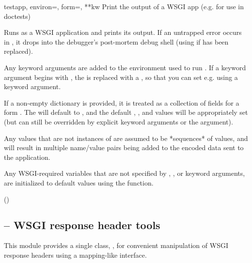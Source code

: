 \begin{funcdesc}{test}{app, environ=\code{\{\}}, form=\code{\{\}}, **kw} 
Print the output of a WSGI app (e.g. for use in doctests)

Runs  as a WSGI application and prints its output.  If an untrapped
error occurs in , it drops into the  debugger's post-mortem
debug shell (using  if  has been
replaced).

Any keyword arguments are added to the environment used to run .  If
a keyword argument begins with , the \code{_} is replaced with a
, so that you can set e.g.  using a
 keyword argument.

If a non-empty  dictionary is provided, it is treated as a collection
of fields for a form . The  will default to
, and the default , , and
 values will be appropriately set (but can still be
overridden by explicit keyword arguments or the  argument).

Any  values that are not instances of  are assumed to
be *sequences* of values, and will result in multiple name/value pairs
being added to the encoded data sent to the application.

Any WSGI-required variables that are not specified by , ,
or keyword arguments, are initialized to default values using the
 function.

()

\end{funcdesc}











\subsection{ -- WSGI response header tools}

This module provides a single class, , for convenient
manipulation of WSGI response headers using a mapping-like interface.

